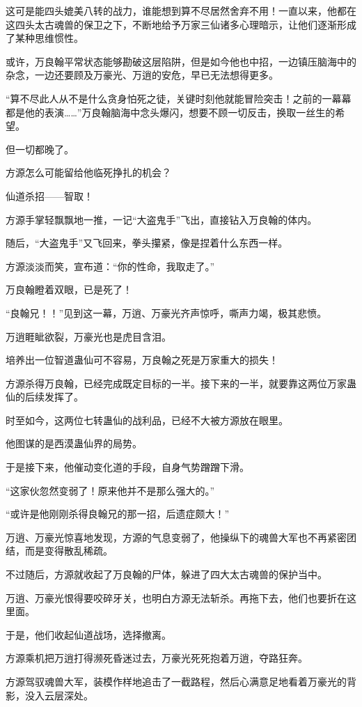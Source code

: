 \begin{this_body}
这可是能四头媲美八转的战力，谁能想到算不尽居然舍弃不用！一直以来，他都在这四头太古魂兽的保卫之下，不断地给予万家三仙诸多心理暗示，让他们逐渐形成了某种思维惯性。

或许，万良翰平常状态能够勘破这层陷阱，但是如今他也中招，一边镇压脑海中的杂念，一边还要顾及万豪光、万逍的安危，早已无法想得更多。

“算不尽此人从不是什么贪身怕死之徒，关键时刻他就能冒险突击！之前的一幕幕都是他的表演……”万良翰脑海中念头爆闪，想要不顾一切反击，换取一丝生的希望。

但一切都晚了。

方源怎么可能留给他临死挣扎的机会？

仙道杀招——智取！

方源手掌轻飘飘地一推，一记“大盗鬼手”飞出，直接钻入万良翰的体内。

随后，“大盗鬼手”又飞回来，拳头攥紧，像是捏着什么东西一样。

方源淡淡而笑，宣布道：“你的性命，我取走了。”

万良翰瞪着双眼，已是死了！

“良翰兄！！”见到这一幕，万逍、万豪光齐声惊呼，嘶声力竭，极其悲愤。

万逍睚眦欲裂，万豪光也是虎目含泪。

培养出一位智道蛊仙可不容易，万良翰之死是万家重大的损失！

方源杀得万良翰，已经完成既定目标的一半。接下来的一半，就要靠这两位万家蛊仙的后续发挥了。

时至如今，这两位七转蛊仙的战利品，已经不大被方源放在眼里。

他图谋的是西漠蛊仙界的局势。

于是接下来，他催动变化道的手段，自身气势蹭蹭下滑。

“这家伙忽然变弱了！原来他并不是那么强大的。”

“或许是他刚刚杀得良翰兄的那一招，后遗症颇大！”

万逍、万豪光惊喜地发现，方源的气息变弱了，他操纵下的魂兽大军也不再紧密团结，而是变得散乱稀疏。

不过随后，方源就收起了万良翰的尸体，躲进了四大太古魂兽的保护当中。

万逍、万豪光恨得要咬碎牙关，也明白方源无法斩杀。再拖下去，他们也要折在这里面。

于是，他们收起仙道战场，选择撤离。

方源乘机把万逍打得濒死昏迷过去，万豪光死死抱着万逍，夺路狂奔。

方源驾驭魂兽大军，装模作样地追击了一截路程，然后心满意足地看着万豪光的背影，没入云层深处。


\end{this_body}
